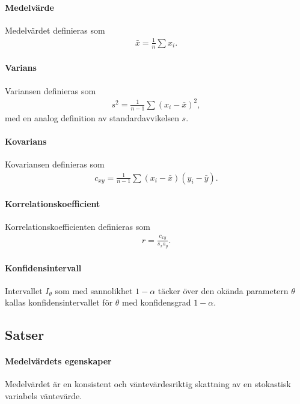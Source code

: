 \paragraph{Medelvärde}
Medelvärdet definieras som
\begin{align*}
	\bar{x} = \frac{1}{n}\sum x_i.
\end{align*}

\paragraph{Varians}
Variansen definieras som
\begin{align*}
	s^2 = \frac{1}{n - 1}\sum (x_i - \bar{x})^2,
\end{align*}
med en analog definition av standardavvikelsen $s$.

\paragraph{Kovarians}
Kovariansen definieras som
\begin{align*}
	c_{xy} = \frac{1}{n - 1}\sum (x_i - \bar{x})(y_i - \bar{y}).
\end{align*}

\paragraph{Korrelationskoefficient}
Korrelationskoefficienten definieras som
\begin{align*}
	r = \frac{c_{xy}}{s_{x}s_{y}}.
\end{align*}

\paragraph{Konfidensintervall}
Intervallet $I_{\theta}$ som med sannolikhet $1 - \alpha$ täcker över den okända parametern $\theta$ kallas konfidensintervallet för $\theta$ med konfidensgrad $1 - \alpha$.

\subsection{Satser}

\paragraph{Medelvärdets egenskaper}
Medelvärdet är en konsistent och väntevärdesriktig skattning av en stokastisk variabels väntevärde.

